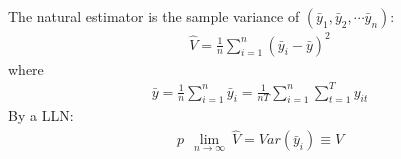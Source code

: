 \documentclass[a4paper,twoside,11pt]{article}
\begin{document}
\begin{shaded*}
\newline
\newline
The natural estimator is the sample variance of $(\bar y_1, \bar y_2, \cdots \bar y_n):$
\begin{equation*}
\begin{aligned}
\hat{V}= \frac{1}{n} \sum^n_{i=1} (\bar y_i - \bar y)^2
\end{aligned} 
\end{equation*}
where 
\begin{equation*}
\begin{aligned}
\bar y = \frac{1}{n} \sum^n_{i=1} \bar y_i = \frac{1}{nT} \sum^n_{i=1} \sum^T_{t=1} y_{it}
\end{aligned} 
\end{equation*}
By a LLN:
\begin{equation*}
\begin{aligned}
p \ \ \underset{n \rightarrow \infty}{\lim} \ \hat{V} = Var(\bar y_i) \equiv V
\end{aligned} 
\end{equation*}
\end{shaded*}
\end{document}
